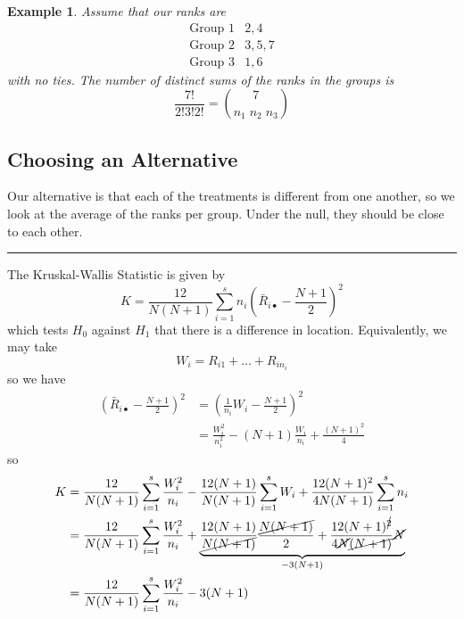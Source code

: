 \documentclass[a4paper,12pt]{amsart}
\newtheorem{ex}{Example}
\begin{document}
\begin{ex}
Assume that our ranks are 
\[\begin{array}{cc}
\text{Group } 1 & 2,4\\
\text{Group } 2 & 3,5,7\\
\text{Group } 3 & 1,6
\end{array} \]
with no ties. The number of distinct sums of the ranks in the groups is 
\[\frac{7!}{2!3!2!} = {7 \choose n_1 \; n_2 \; n_3}\]
\end{ex}
\subsection{Choosing an Alternative}
Our alternative is that each of the treatments is different from one another, so we look at the average of the ranks per group. Under the null, they should be close to each other.

\bigskip
\hrule
\bigskip

The Kruskal-Wallis Statistic is given by
\[K = \frac{12}{N(N+1)}\sum_{i=1}^s n_i \left(\bar{R}_{i\bullet} - \frac{N+1}{2}\right)^2\]
which tests $H_0$ against $H_1$ that there is a difference in location. Equivalently, we may take
\[W_i = R_{i1} + \ldots + R_{in_i}\]
so we have
\begin{align*}
\left(\bar{R}_{i\bullet} - \frac{N+1}{2}\right)^2 &= \left(\frac{1}{n_i}W_i - \frac{N+1}{2}\right)^2\\
&= \frac{W_i^2}{n_i^2} - (N+1)\frac{W_i}{n_i} + \frac{(N+1)^2}{4}
\end{align*}
so
\begin{align*}
K &= \frac{12}{N(N+1)}\sum_{i=1}^s \frac{W_i^2}{n_i} - \frac{12(N+1)}{N(N+1)}\sum_{i=1}^s W_i + \frac{12(N+1)^2}{4N(N+1)}\sum_{i=1}^s n_i\\
&= \frac{12}{N(N+1)}\sum_{i=1}^s \frac{W_i^2}{n_i} + \underbrace{\frac{12(N+1)}{\cancel{N(N+1)}}\frac{\cancel{N(N+1)}}{2} + \frac{12(N+1)^{\cancel{2}}}{4\cancel{N}\cancel{(N+1)}}\cancel{N}}_{-3(N+1)}\\
&=\frac{12}{N(N+1)}\sum_{i=1}^s \frac{W_i^2}{n_i}  - 3(N+1)
\end{align*}
\end{document}
